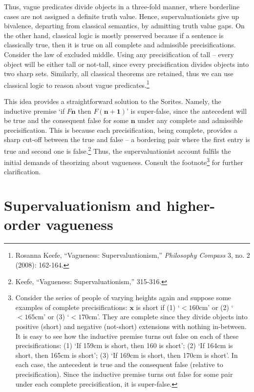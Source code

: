 Thus, vague predicates divide objects in a three-fold manner, where
borderline cases are not assigned a definite truth value. Hence,
supervaluationists give up bivalence, departing from classical
semantics, by admitting truth value gaps. On the other hand, classical
logic is mostly preserved because if a sentence is classically true,
then it is true on all complete and admissible precisifications.
Consider the law of excluded middle. Using any precisification of tall
-- every object will be either tall or not-tall, since every
precisification divides objects into two sharp sets. Similarly, all
classical theorems are retained, thus we can use classical logic to
reason about vague predicates.\footnote{Rosanna Keefe, ``Vagueness:
  Supervaluationism,'' \emph{Philosophy Compass} 3, no. 2 (2008):
  162-164.}

This idea provides a straightforward solution to the Sorites. Namely,
the inductive premise `if $F\mathbf{n}$ then $F(\mathbf{n+1})$' is
super-false, since the antecedent will be true and the consequent false
for some $\mathbf{n}$ under any complete and admissible precisification.
This is because each precisification, being complete, provides a sharp
cut-off between the true and false -- a bordering pair where the first
entry is true and second one is false.\footnote{Keefe, ``Vagueness:
  Supervaluationism,'' 315-316.} Thus, the supervaluationist account
fulfils the initial demands of theorizing about vagueness. Consult the
footnote\footnote{Consider the series of people of varying heights again
  and suppose some examples of complete precisifications: $\mathbf{x}$ is
  short if (1) `$<160\text{cm}$' or (2) `$<165\text{cm}$' or (3)
  `$<170\text{cm}$'. They are complete since they divide objects into
  positive (short) and negative (not-short) extensions with nothing
  in-between. It is easy to see how the inductive premise turns out
  false on each of these precisifications: (1) `If 159cm is short, then
  160 is short'; (2) `If 164cm is short, then 165cm is short'; (3) `If
  169cm is short, then 170cm is short'. In each case, the antecedent is
  true and the consequent false (relative to precisification). Since the
  inductive premise turns out false for some pair under each complete
  precisification, it is super-false.} for further clarification.

\section{Supervaluationism and higher-order vagueness}

